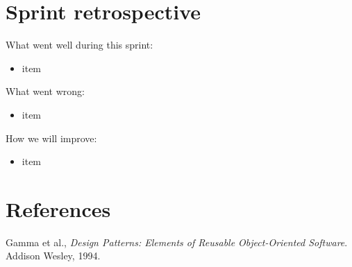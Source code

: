 \documentclass[a4paper,11pt]{article}
\begin{document}

\section{Sprint retrospective}

What went well during this sprint:

\begin{itemize}
	\item item
\end{itemize}

\noindent
What went wrong:

\begin{itemize}
	\item item
\end{itemize}

\noindent
How we will improve:
\begin{itemize}
	\item item
\end{itemize}

\section{References}
\begin{thebibliography}{9}
\vspace{-3em}

  Gamma et al.,
  \emph{Design Patterns: Elements of Reusable Object-Oriented Software}.
  Addison Wesley, 1994.

\end{thebibliography}
\end{document}
